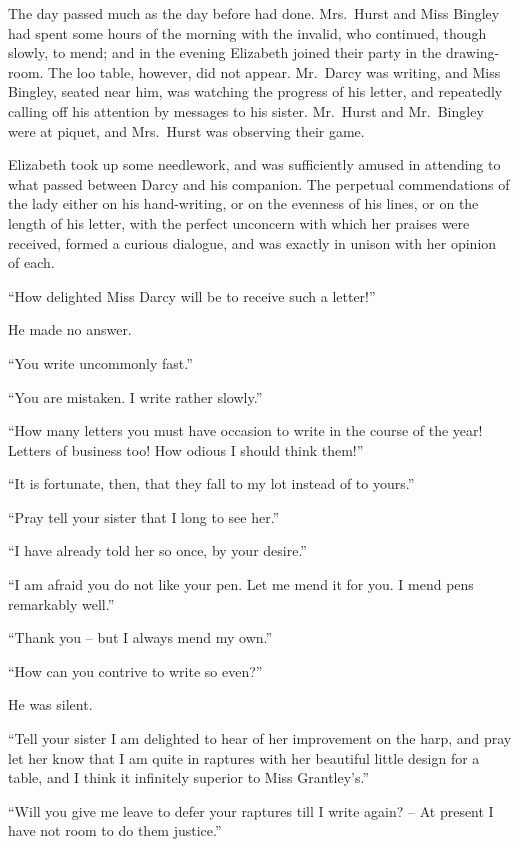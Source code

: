 
The day passed much as the day before had done.
Mrs.\ Hurst and Miss Bingley had spent some hours of the
morning with the invalid, who continued, though slowly,
to mend; and in the evening Elizabeth joined their party
in the drawing-room. The loo table, however, did not
appear. Mr.\ Darcy was writing, and Miss Bingley, seated
near him, was watching the progress of his letter, and
repeatedly calling off his attention by messages to his
sister. Mr.\ Hurst and Mr.\ Bingley were at piquet, and
Mrs.\ Hurst was observing their game.

Elizabeth took up some needlework, and was sufficiently
amused in attending to what passed between Darcy and
his companion. The perpetual commendations of the
lady either on his hand-writing, or on the evenness of
his lines, or on the length of his letter, with the perfect
unconcern with which her praises were received, formed
a curious dialogue, and was exactly in unison with her
opinion of each.

“How delighted Miss Darcy will be to receive such
a letter!”

He made no answer.

“You write uncommonly fast.”

“You are mistaken. I write rather slowly.”

“How many letters you must have occasion to write
in the course of the year! Letters of business too! How
odious I should think them!”

“It is fortunate, then, that they fall to my lot instead
of to yours.”

“Pray tell your sister that I long to see her.”

“I have already told her so once, by your desire.”

“I am afraid you do not like your pen. Let me mend
it for you. I mend pens remarkably well.”

“Thank you -- but I always mend my own.”

“How can you contrive to write so even?”

He was silent.

“Tell your sister I am delighted to hear of her improvement
on the harp, and pray let her know that I am quite
in raptures with her beautiful little design for a table,
and I think it infinitely superior to Miss Grantley’s.”

“Will you give me leave to defer your raptures till
I write again? -- At present I have not room to do them
justice.”

